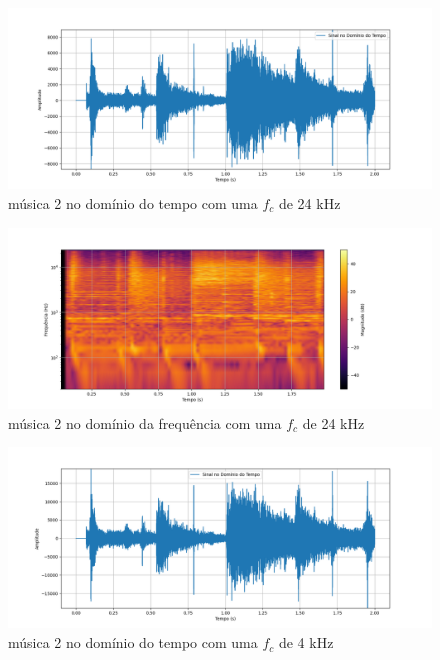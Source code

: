 \begin{anexosenv}
\begin{figure}[h]
	\centering
    \includegraphics[width=\textwidth]{figuras/fig32.png}
	\caption{música 2 no domínio do tempo com uma $f_c$ de 24 kHz}
	\label{fig32}
\end{figure}

\begin{figure}[h]
	\centering
    \includegraphics[width=\textwidth]{figuras/fig33.png}
	\caption{música 2 no domínio da frequência com uma $f_c$ de 24 kHz}
	\label{fig33}
\end{figure}

\begin{figure}[h]
	\centering
    \includegraphics[width=\textwidth]{figuras/fig34.png}
	\caption{música 2 no domínio do tempo com uma $f_c$ de 4 kHz}
	\label{fig34}
\end{figure}


\end{anexosenv}
